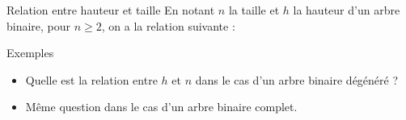 \documentclass[10pt]{beamer}
\begin{document}
\begin{frame}
	\mframe{\AB}
	\begin{alertblock}{Relation entre hauteur et taille}
		En notant $n$ la taille et $h$ la hauteur d'un arbre binaire, pour $n \geq 2$, on a la relation suivante : \\
		\onslide<2->{$$ \boxed{ h \leq n \leq 2^{h}-1} $$}
	\end{alertblock}
	\begin{exampleblock}{Exemples}
		\begin{itemize}
			\item<3-> Quelle est la relation entre $h$ et $n$ dans le cas d'un arbre binaire dégénéré ?
			\item<4-> Même question dans le cas d'un arbre binaire complet.
		\end{itemize}
	\end{exampleblock}
\end{frame}
\end{document}
